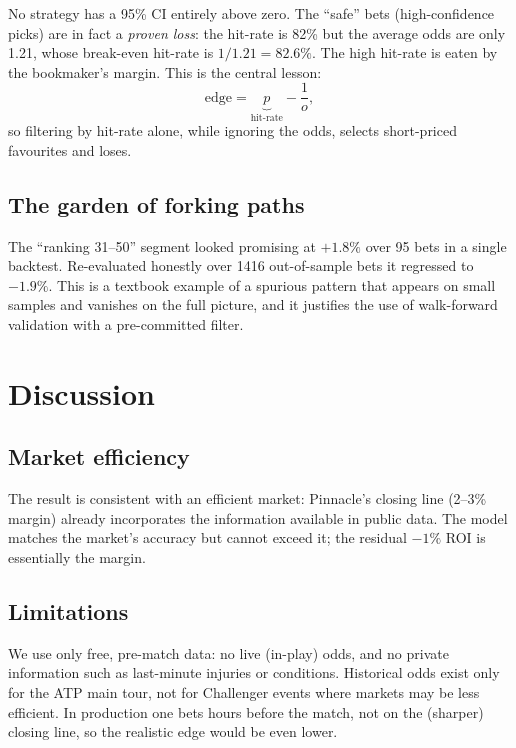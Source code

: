 \documentclass[10pt,twocolumn]{article}
\begin{document}
\noindent No strategy has a 95\% CI entirely above zero. The ``safe'' bets
(high-confidence picks) are in fact a \emph{proven loss}: the hit-rate is 82\%
but the average odds are only 1.21, whose break-even hit-rate is
$1/1.21 = 82.6\%$. The high hit-rate is eaten by the bookmaker's margin. This is
the central lesson:
\begin{equation}
  \text{edge} = \underbrace{p}_{\text{hit-rate}} - \frac{1}{o},
\end{equation}
so filtering by hit-rate alone, while ignoring the odds, selects short-priced
favourites and loses.

\subsection{The garden of forking paths}
The ``ranking 31--50'' segment looked promising at $+1.8\%$ over 95 bets in a
single backtest. Re-evaluated honestly over \num{1416} out-of-sample bets it
regressed to $-1.9\%$. This is a textbook example of a spurious pattern that
appears on small samples and vanishes on the full picture, and it justifies the
use of walk-forward validation with a pre-committed filter.

\section{Discussion}

\subsection{Market efficiency}
The result is consistent with an efficient market: Pinnacle's closing line
(2--3\% margin) already incorporates the information available in public data.
The model matches the market's accuracy but cannot exceed it; the residual
$-1\%$ ROI is essentially the margin.

\subsection{Limitations}
We use only free, pre-match data: no live (in-play) odds, and no private
information such as last-minute injuries or conditions. Historical odds exist
only for the ATP main tour, not for Challenger events where markets may be less
efficient. In production one bets hours before the match, not on the (sharper)
closing line, so the realistic edge would be even lower.
\end{document}

